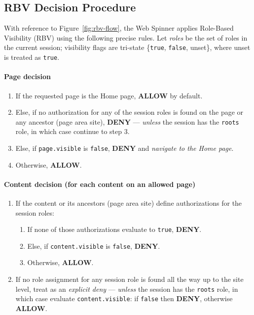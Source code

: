 \subsection{RBV Decision Procedure}
\label{sec:rbv-decision}

With reference to Figure~\ref{fig:rbv-flow}, the Web Spinner applies Role-Based Visibility (RBV) using the following precise rules. Let \emph{roles} be the set of roles in the current session; visibility flags are tri-state \{\texttt{true}, \texttt{false}, unset\}, where unset is treated as \texttt{true}.

\paragraph{Page decision}
\begin{enumerate}
	\item If the requested page is the Home page, \textbf{ALLOW} by default.
	\item Else, if no authorization for any of the session roles is found on the page or any ancestor (page \textrightarrow{} area \textrightarrow{} site), \textbf{DENY} — \emph{unless} the session has the \texttt{roots} role, in which case continue to step 3.
	\item Else, if \texttt{page.visible} is \texttt{false}, \textbf{DENY} and \emph{navigate to the Home page}.
	\item Otherwise, \textbf{ALLOW}.
\end{enumerate}

\paragraph{Content decision (for each content on an allowed page)}
\begin{enumerate}
	\item If the content or its ancestors (page \textrightarrow{} area \textrightarrow{} site) define authorizations for the session roles:
		\begin{enumerate}
			\item If none of those authorizations evaluate to \texttt{true}, \textbf{DENY}.
			\item Else, if \texttt{content.visible} is \texttt{false}, \textbf{DENY}.
			\item Otherwise, \textbf{ALLOW}.
		\end{enumerate}
	\item If no role assignment for any session role is found all the way up to the site level, treat as an \emph{explicit deny} — \emph{unless} the session has the \texttt{roots} role, in which case evaluate \texttt{content.visible}: if \texttt{false} then \textbf{DENY}, otherwise \textbf{ALLOW}.
\end{enumerate}


